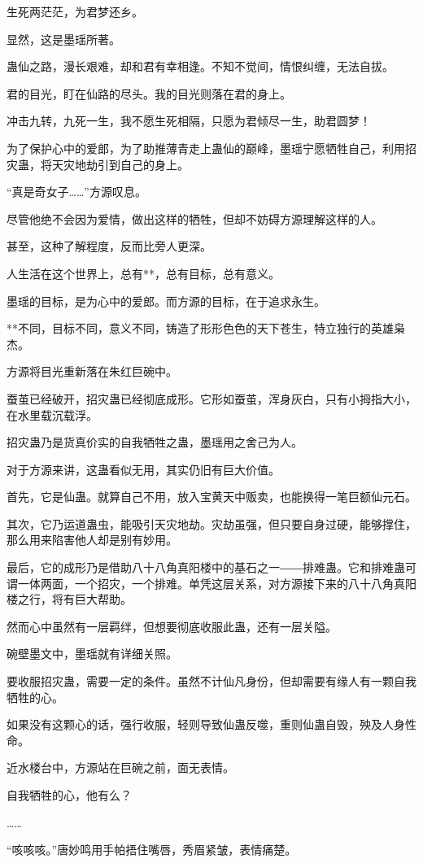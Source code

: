 \begin{this_body}
生死两茫茫，为君梦还乡。

显然，这是墨瑶所著。

蛊仙之路，漫长艰难，却和君有幸相逢。不知不觉间，情恨纠缠，无法自拔。

君的目光，盯在仙路的尽头。我的目光则落在君的身上。

冲击九转，九死一生，我不愿生死相隔，只愿为君倾尽一生，助君圆梦！

为了保护心中的爱郎，为了助推薄青走上蛊仙的巅峰，墨瑶宁愿牺牲自己，利用招灾蛊，将天灾地劫引到自己的身上。

“真是奇女子……”方源叹息。

尽管他绝不会因为爱情，做出这样的牺牲，但却不妨碍方源理解这样的人。

甚至，这种了解程度，反而比旁人更深。

人生活在这个世界上，总有**，总有目标，总有意义。

墨瑶的目标，是为心中的爱郎。而方源的目标，在于追求永生。

**不同，目标不同，意义不同，铸造了形形色色的天下苍生，特立独行的英雄枭杰。

方源将目光重新落在朱红巨碗中。

蚕茧已经破开，招灾蛊已经彻底成形。它形如蚕茧，浑身灰白，只有小拇指大小，在水里载沉载浮。

招灾蛊乃是货真价实的自我牺牲之蛊，墨瑶用之舍己为人。

对于方源来讲，这蛊看似无用，其实仍旧有巨大价值。

首先，它是仙蛊。就算自己不用，放入宝黄天中贩卖，也能换得一笔巨额仙元石。

其次，它乃运道蛊虫，能吸引天灾地劫。灾劫虽强，但只要自身过硬，能够撑住，那么用来陷害他人却是别有妙用。

最后，它的成形乃是借助八十八角真阳楼中的基石之一――排难蛊。它和排难蛊可谓一体两面，一个招灾，一个排难。单凭这层关系，对方源接下来的八十八角真阳楼之行，将有巨大帮助。

然而心中虽然有一层羁绊，但想要彻底收服此蛊，还有一层关隘。

碗壁墨文中，墨瑶就有详细关照。

要收服招灾蛊，需要一定的条件。虽然不计仙凡身份，但却需要有缘人有一颗自我牺牲的心。

如果没有这颗心的话，强行收服，轻则导致仙蛊反噬，重则仙蛊自毁，殃及人身性命。

近水楼台中，方源站在巨碗之前，面无表情。

自我牺牲的心，他有么？

……

“咳咳咳。”唐妙鸣用手帕捂住嘴唇，秀眉紧皱，表情痛楚。


\end{this_body}
